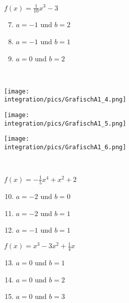 \begin{Exercise}[title={\raggedright\normalfont Schätze jeweils den Wert der Integrale zwischen der unteren Grenze \(a\) und der oberen Grenze \(b\) an Hand des Schaubilds der Funktion ab.}, label=integralGrafisch1]
\begin{minipage}{\textwidth}
\begin{minipage}{.33\textwidth}
			\(f(x)=\frac{1}{10}x^3-3\)
			\begin{enumerate}[label=\alph*)]
				\setcounter{enumi}{6}
				\item \(a=-1\) und \(b=2\)
				\item \(a=-1\) und \(b=1\)
				\item \(a=0\) und \(b=2\)
			\end{enumerate}
		\end{minipage}
	\end{minipage}
	\vspace{1cm}\\
	\begin{minipage}{\textwidth}
		\begin{minipage}{.33\textwidth}
			\texttt{[image: \\integration/pics/GrafischA1\_4.png]}
		\end{minipage}
		\begin{minipage}{.33\textwidth}
			\texttt{[image: \\integration/pics/GrafischA1\_5.png]}
		\end{minipage}
		\begin{minipage}{.33\textwidth}
			\texttt{[image: \\integration/pics/GrafischA1\_6.png]}
		\end{minipage}
	\end{minipage}
	\vspace{0.3cm}\\
	\begin{minipage}{\textwidth}
		\begin{minipage}{.33\textwidth}\raggedright
			\(f(x)=-\frac{1}{5}x^4+x^2+2\)
			\begin{enumerate}[label=\alph*)]
				\setcounter{enumi}{9}
				\item \(a=-2\) und \(b=0\)
				\item \(a=-2\) und \(b=1\)
				\item \(a=-1\) und \(b=1\)
			\end{enumerate}
		\end{minipage}
		\begin{minipage}{.33\textwidth}\raggedright
			\(f(x)=x^3-3x^2+\frac{1}{4}x\)
			\begin{enumerate}[label=\alph*)]
				\setcounter{enumi}{12}
				\item \(a=0\) und \(b=1\)
				\item \(a=0\) und \(b=2\)
				\item \(a=0\) und \(b=3\)
			\end{enumerate}
		\end{minipage}

\end{minipage}
\end{Exercise}

